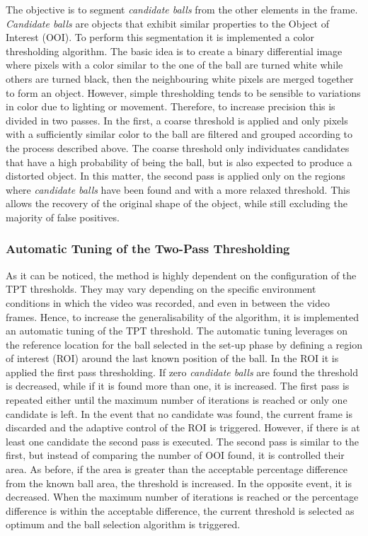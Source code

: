 \documentclass[a4paper]{article}
\begin{document}
The objective is to segment \textit{candidate balls} from the other elements in the frame. \textit{Candidate balls} are objects that exhibit similar properties to the Object of Interest (OOI). To perform this segmentation it is implemented a color thresholding algorithm. The basic idea is to create a binary differential image where pixels with a color similar to the one of the ball are turned white while others are turned black, then the neighbouring white pixels are merged together to form an object. However, simple thresholding tends to be sensible to variations in color due to lighting or movement. Therefore, to increase precision this is divided in two passes. In the first, a coarse threshold is applied and only pixels with a sufficiently similar color to the ball are filtered and grouped according to the process described above. The coarse threshold only individuates candidates that have a high probability of being the ball, but is also expected to produce a distorted object. In this matter, the second pass is applied only on the regions where \textit{candidate balls} have been found and with a more relaxed threshold. This allows the recovery of the original shape of the object, while still excluding the majority of false positives. 

\subsubsection{Automatic Tuning of the Two-Pass Thresholding}
As it can be noticed, the method is highly dependent on the configuration of the TPT thresholds. They may vary depending on the specific environment conditions in which the video was recorded, and even in between the video frames. Hence, to increase the generalisability of the algorithm, it is implemented an automatic tuning of the TPT threshold. 
The automatic tuning leverages on the reference location for the ball selected in the set-up phase by defining a region of interest (ROI) around the last known position of the ball. In the ROI it is applied the first pass thresholding. If zero \textit{candidate balls} are found the threshold is decreased, while if it is found more than one, it is increased. The first pass is repeated either until the maximum number of iterations is reached or only one candidate is left. In the event that no candidate was found, the current frame is discarded and the adaptive control of the ROI is triggered. However, if there is at least one candidate the second pass is executed. The second pass is similar to the first, but instead of comparing the number of OOI found, it is controlled their area. As before, if the area is greater than the acceptable percentage difference from the known ball area, the threshold is increased. In the opposite event, it is decreased. When the maximum number of iterations is reached or the percentage difference is within the acceptable difference, the current threshold is selected as optimum and the ball selection algorithm is triggered. 
\end{document}
